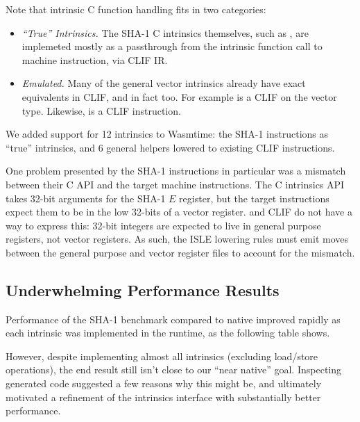 Note that intrinsic C function handling fits in two categories:
\begin{itemize}
    \item \emph{``True'' Intrinsics.}
        The SHA-1 C intrinsics themselves, such as , are
        implemeted mostly as a passthrough from the intrinsic function call to
        machine instruction, via CLIF IR.
    \item \emph{Emulated.}
        Many of the general vector intrinsics already have exact equivalents in
        CLIF, and in fact \wasm too.  For example  is a CLIF
         on the vector  type.  Likewise,
         is a CLIF  instruction.
\end{itemize}

We added support for 12 intrinsics to Wasmtime: the SHA-1 instructions as
``true'' intrinsics, and 6 general helpers lowered to existing CLIF
instructions.

One problem presented by the SHA-1 instructions in particular was a mismatch
between their C API and the target machine instructions.  The C intrinsics API
takes 32-bit arguments for the SHA-1 $E$ register, but the target instructions
expect them to be in the low 32-bits of a vector register. \wasm and CLIF do not
have a way to express this: 32-bit integers are expected to live in general
purpose registers, not vector registers. As such, the ISLE lowering rules must
emit moves between the general purpose and vector register files to account for
the mismatch.

\subsection{Underwhelming Performance Results}

Performance of the SHA-1 benchmark compared to native improved rapidly as each
intrinsic was implemented in the runtime, as the following table shows.

\begin{center}

\end{center}

However, despite implementing almost all intrinsics (excluding load/store
operations), the end result still isn't close to our ``near native'' goal.
Inspecting generated code suggested a few reasons why this might be, and
ultimately motivated a refinement of the intrinsics interface with substantially
better performance.

